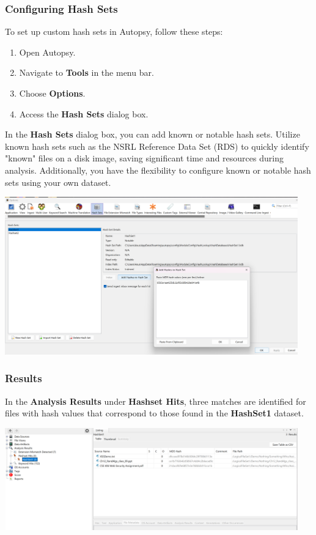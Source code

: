 \documentclass{article}
\begin{document}
\subsubsection*{Configuring Hash Sets}

To set up custom hash sets in Autopsy, follow these steps:

\begin{enumerate}
  \item Open Autopsy.
  \item Navigate to \textbf{Tools} in the menu bar.
  \item Choose \textbf{Options}.
  \item Access the \textbf{Hash Sets} dialog box.
\end{enumerate}

In the \textbf{Hash Sets} dialog box, you can add known or notable hash sets. Utilize known hash sets such as the NSRL Reference Data Set (RDS) to quickly identify "known" files on a disk image, saving significant time and resources during analysis. Additionally, you have the flexibility to configure known or notable hash sets using your own dataset.

\begin{center}
    \includegraphics[width=0.95\textwidth]{3/3.2/Hash Set Custom Configuration.png}
\end{center}

\subsubsection*{Results}
In the \textbf{Analysis Results} under \textbf{Hashset Hits}, three matches are identified for files with hash values that correspond to those found in the \textbf{HashSet1} dataset.
\begin{center}
    \includegraphics[width=0.95\textwidth]{3/3.2/Results of Hash Lookup ingest module.png}
\end{center}
\end{document}
